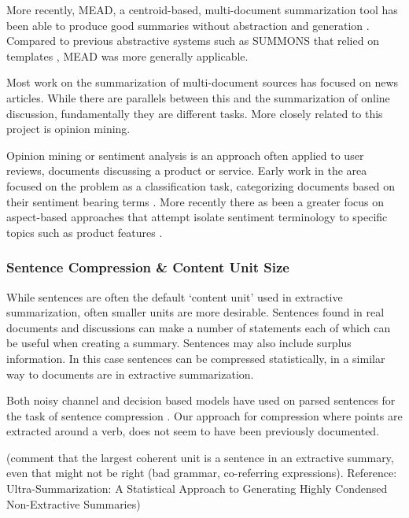         More recently, MEAD, a centroid-based, multi-document summarization tool has been able to produce good summaries without abstraction and generation \cite{radev2000centroid}. Compared to previous abstractive systems such as SUMMONS that relied on templates \cite{mckeown1995generating}, MEAD was more generally applicable.

        Most work on the summarization of multi-document sources has focused on news articles. While there are parallels between this and the summarization of online discussion, fundamentally they are different tasks. More closely related to this project is opinion mining.

        Opinion mining or sentiment analysis is an approach often applied to user reviews, documents discussing a product or service. Early work in the area focused on the problem as a classification task, categorizing documents based on their sentiment bearing terms \cite{turney2002thumbs}. More recently there as been a greater focus on aspect-based approaches that attempt isolate sentiment terminology to specific topics such as product features \cite{hu2004mining}.

      \subsubsection{Sentence Compression \& Content Unit Size}
        While sentences are often the default `content unit' used in extractive summarization, often smaller units are more desirable. Sentences found in real documents and discussions can make a number of statements each of which can be useful when creating a summary. Sentences may also include surplus information. In this case sentences can be compressed statistically, in a similar way to documents are in extractive summarization.

        Both noisy channel and decision based models have used on parsed sentences for the task of sentence compression \cite{knight2000statistics}. Our approach for compression where points are extracted around a verb, does not seem to have been previously documented.

        (comment that the largest coherent unit is a sentence in an extractive summary, even that might not be right (bad grammar, co-referring expressions). Reference: Ultra-Summarization: A Statistical Approach to Generating
        Highly Condensed Non-Extractive Summaries)

